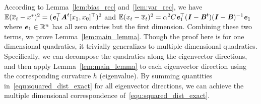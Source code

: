 According to Lemma~\ref{lem:bias_rec} and~\ref{lem:var_rec}, we have $\mathbb{E} ( \overline{x}_t - x^{*} )^2 = (\bm{\mathit{e}}^{\top}_1 \bm{\mathit{A}}^t [x_1, x_0]^{\top})^2$ and $\mathbb{E} ( x_t - \overline{x}_t )^2=\alpha^2 C \bm{\mathit{e}}^{\top}_1 (\bm{\mathit{I}} - \bm{\mathit{B}}^t)(\bm{\mathit{I}} - \bm{\mathit{B}})^{-1}\bm{\mathit{e}}_1$ where $\bm{\mathit{e}}_1 \in \mathbb{R}^n$ has all zero entries but the first dimension. Combining these two terms, we prove Lemma~\ref{lem:main_lemma}. Though the proof here is for one dimensional quadratics, it trivially generalizes to multiple dimensional quadratics. Specifically, we can decompose the quadratics along the eigenvector directions, and then apply Lemma~\ref{lem:main_lemma} to each eigenvector direction using the corresponding curvature $h$ (eigenvalue). By summing quantities in~\eqref{equ:squared_dist_exact} for all eigenvector directions, we can achieve the multiple dimensional correspondence of~\eqref{equ:squared_dist_exact}.




